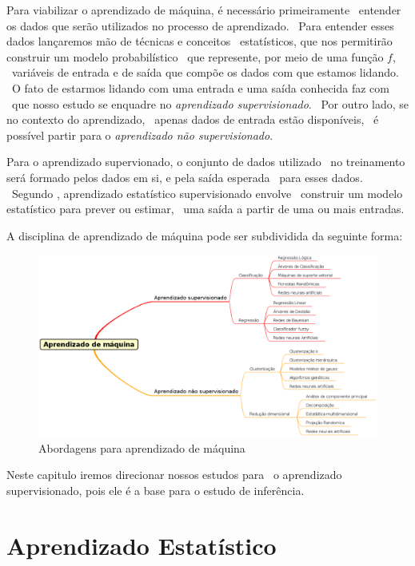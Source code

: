 Para viabilizar o aprendizado de máquina, é necessário primeiramente \
entender os dados que serão utilizados no processo de aprendizado. \
Para entender esses dados lançaremos mão de técnicas e conceitos \
estatísticos, que nos permitirão construir um modelo probabilístico \
que represente, por meio de uma função $f$, \
variáveis de entrada e de saída que compõe os dados com que estamos lidando. \
O fato de estarmos lidando com uma entrada e uma saída conhecida faz com \
que nosso estudo se enquadre no \textit{aprendizado supervisionado}. \
Por outro lado, se no contexto do aprendizado, \
apenas dados de entrada estão disponíveis, \
é possível partir para o \textit{aprendizado não supervisionado}.

Para o aprendizado supervionado, o conjunto de dados utilizado \
no treinamento será formado pelos dados em si, e pela saída esperada \
para esses dados\cite{Louridas}. \
Segundo \cite{James}, aprendizado estatístico supervisionado envolve \
construir um modelo estatístico para prever ou estimar, \
uma saída a partir de uma ou mais entradas.



A disciplina de aprendizado de máquina pode ser subdividida da seguinte forma:
\begin{figure}[h]
	\centering
	\label{fig01}
        \includegraphics[scale=0.48]{figuras/mind1.eps}
	\caption{Abordagens para aprendizado de máquina}
\end{figure}
Neste capitulo iremos direcionar nossos estudos para \
o aprendizado supervisionado, pois ele é a base para o estudo de inferência.

\section{Aprendizado Estatístico}

